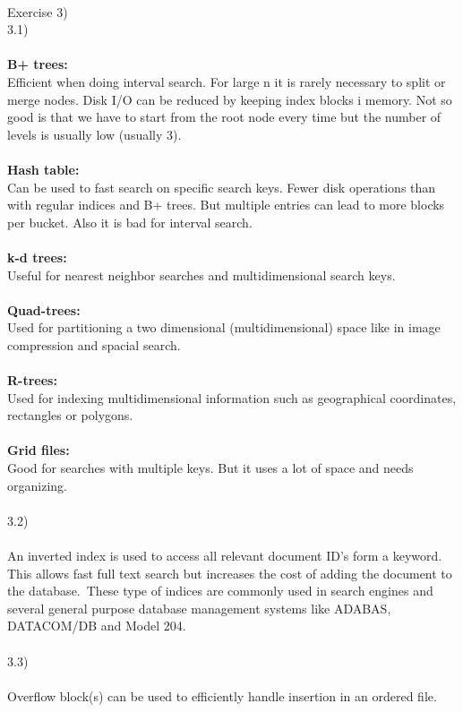 \documentclass[12pt, letterpaper, twoside]{article}
\begin{document}
\\
Exercise 3)\\
3.1)\\
\\
\textbf{B+ trees:}\\
Efficient when doing interval search. For large n it is rarely necessary to split or merge nodes. Disk I/O can be reduced by keeping index blocks i memory.
Not so good is that we have to start from the root node every time but the number of levels is usually low (usually 3).\\
\\
\textbf{Hash table:}\\
Can be used to fast search on specific search keys. Fewer disk operations than with regular indices and B+ trees. But multiple entries can lead to more blocks per bucket. Also it is bad for interval search.\\
\\
\textbf{k-d trees:}\\
Useful for nearest neighbor searches and multidimensional search keys.\\
\\
\textbf{Quad-trees:}\\
Used for partitioning a two dimensional (multidimensional) space like in image compression and spacial search.\\
\\
\textbf{R-trees:}\\
Used for indexing multidimensional information such as geographical coordinates, rectangles or polygons.\\
\\
\textbf{Grid files:}\\
Good for searches with multiple keys. But it uses a lot of space and needs organizing.\\
\\
3.2)\\
\\
An inverted index is used to access all relevant document ID's form a keyword. This allows fast full text search but increases the cost of adding the document to the database.\ These type of indices are commonly used in search engines and several general purpose database management systems like ADABAS, DATACOM/DB and Model 204.\\
\\
3.3)\\
\\
Overflow block(s) can be used to efficiently handle insertion in an ordered file.\\
\end{document}
